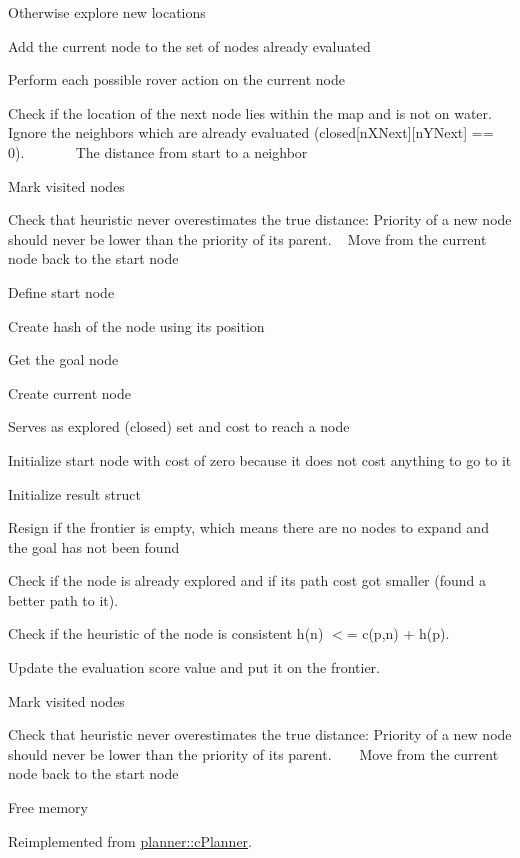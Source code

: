 Otherwise explore new locations

Add the current node to the set of nodes already evaluated

Perform each possible rover action on the current node

Check if the location of the next node lies within the map and is not on water. Ignore the neighbors which are already evaluated (closed\mbox{[}n\+X\+Next\mbox{]}\mbox{[}n\+Y\+Next\mbox{]} == 0). ~\newline
~\newline
~\newline
~\newline
 The distance from start to a neighbor

Mark visited nodes

Check that heuristic never overestimates the true distance\+: Priority of a new node should never be lower than the priority of its parent. ~\newline
 Move from the current node back to the start node

Define start node

Create hash of the node using its position

Get the goal node

Create current node

Serves as explored (closed) set and cost to reach a node

Initialize start node with cost of zero because it does not cost anything to go to it

Initialize result struct

Resign if the frontier is empty, which means there are no nodes to expand and the goal has not been found

Check if the node is already explored and if its path cost got smaller (found a better path to it).

Check if the heuristic of the node is consistent h(n) $<$= c(p,n) + h(p).

Update the evaluation score value and put it on the frontier.

Mark visited nodes

Check that heuristic never overestimates the true distance\+: Priority of a new node should never be lower than the priority of its parent. ~\newline
~\newline
 Move from the current node back to the start node

Free memory 

Reimplemented from \mbox{\hyperlink{classplanner_1_1c_planner_a341e70531266f023ac9461d18979d1ef}{planner\+::c\+Planner}}.

